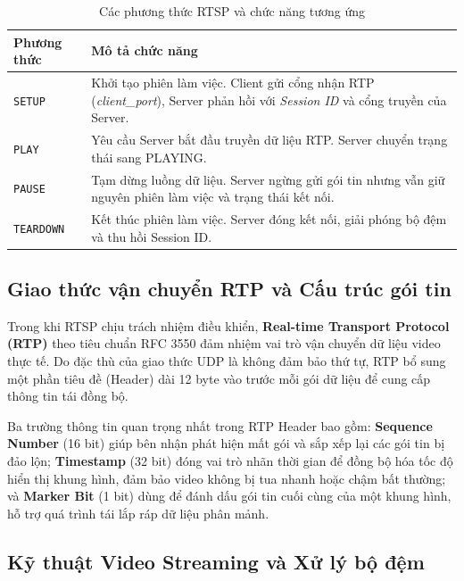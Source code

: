 \FloatBarrier
\begin{table}[H]
    \centering
    \caption{Các phương thức RTSP và chức năng tương ứng}
    \label{tab:rtsp_methods}
    \begin{tabular}{p{}p{}}
        \toprule
        \textbf{Phương thức} & \textbf{Mô tả chức năng} \\
        \midrule
        \texttt{SETUP} & Khởi tạo phiên làm việc. Client gửi cổng nhận RTP (\textit{client\_port}), Server phản hồi với \textit{Session ID} và cổng truyền của Server. \\
        \texttt{PLAY} & Yêu cầu Server bắt đầu truyền dữ liệu RTP. Server chuyển trạng thái sang PLAYING. \\
        \texttt{PAUSE} & Tạm dừng luồng dữ liệu. Server ngừng gửi gói tin nhưng vẫn giữ nguyên phiên làm việc và trạng thái kết nối. \\
        \texttt{TEARDOWN} & Kết thúc phiên làm việc. Server đóng kết nối, giải phóng bộ đệm và thu hồi Session ID. \\
        \bottomrule
    \end{tabular}
\end{table}
\FloatBarrier

\subsection{Giao thức vận chuyển RTP và Cấu trúc gói tin}

Trong khi RTSP chịu trách nhiệm điều khiển, \textbf{Real-time Transport Protocol (RTP)} theo tiêu chuẩn RFC 3550 \cite{rfc3550} đảm nhiệm vai trò vận chuyển dữ liệu video thực tế. Do đặc thù của giao thức UDP là không đảm bảo thứ tự, RTP bổ sung một phần tiêu đề (Header) dài 12 byte vào trước mỗi gói dữ liệu để cung cấp thông tin tái đồng bộ.

Ba trường thông tin quan trọng nhất trong RTP Header bao gồm: \textbf{Sequence Number} (16 bit) giúp bên nhận phát hiện mất gói và sắp xếp lại các gói tin bị đảo lộn; \textbf{Timestamp} (32 bit) đóng vai trò nhãn thời gian để đồng bộ hóa tốc độ hiển thị khung hình, đảm bảo video không bị tua nhanh hoặc chậm bất thường; và \textbf{Marker Bit} (1 bit) dùng để đánh dấu gói tin cuối cùng của một khung hình, hỗ trợ quá trình tái lắp ráp dữ liệu phân mảnh.

\subsection{Kỹ thuật Video Streaming và Xử lý bộ đệm}

